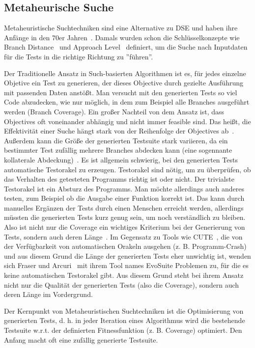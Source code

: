 \documentclass{article}
\begin{document}
\subsection{Metaheurische Suche}
Metaheuristische Suchtechniken sind eine Alternative zu DSE und haben ihre Anfänge in den 70er Jahren~\cite{McMinn_2004}. Damals wurden schon die Schlüsselkonzepte wie Branch Distance~\cite{Korel1990} und Approach Level~\cite{Wegener2001} definiert, um die Suche nach Inputdaten für die Tests in die richtige Richtung zu ''führen''.  

Der Traditionelle Ansatz in Such-basierten Algorithmen ist es, für jedes einzelne Objetive ein Test zu generieren, der dieses Objective durch gezielte Ausführung mit passenden Daten anstößt. Man versucht mit den generierten Tests so viel Code abzudecken, wie nur möglich, in dem zum Beispiel alle Branches ausgeführt werden (Branch Coverage). Ein großer Nachteil von dem Ansatz ist, dass Objectives oft voneinander abhängig und nicht immer feasible sind. Das heißt, die Effektivität einer Suche hängt stark von der Reihenfolge der Objectives ab~\cite{Fraser_2013}. Außerdem kann die Größe der generierten Testsuite stark variieren, da ein bestimmter Test zufällig mehrere Branches abdecken kann (eine sogennante kollaterale Abdeckung)~\cite{Harman2010}. Es ist allgemein schwierig, bei den generierten Tests automatische Testorakel zu erzeugen. Testorakel sind nötig, um zu überprüfen, ob das Verhalten des getesteten Programms richtig ist oder nicht. Der trivialste Testorakel ist ein Absturz des Programms.  Man möchte allerdings auch anderes testen, zum Beispiel ob die Ausgabe einer Funktion korrekt ist. Das kann durch manuelles Ergänzen der Tests durch einen Menschen erreicht werden, allerdings müssten die generierten Tests kurz genug sein, um noch verständlich zu bleiben. Also ist nicht nur die Coverage ein wichtiges Kriterium bei der Generierung von Tests, sondern auch deren Länge~\cite{Fraser_2013}. Im Gegensatz zu Tools wie CUTE~\cite{10.1007/11817963_38}, die von der Verfügbarkeit von automatischen Orakeln ausgehen (z. B. Programm-Crash) und aus diesem Grund die Länge der generierten Tests eher unwichtig ist, wenden sich Fraser und Arcuri~\cite{Fraser_2011} mit ihrem Tool names EvoSuite Problemen zu, für die es keine automatischen Testorakel gibt. Aus diesem Grund steht bei ihrem Ansatz nicht nur die Qualität der generierten Tests (also die Coverage), sondern auch deren Länge im Vordergrund. 

Der Kernpunkt von Metaheuristischen Suchtechniken ist die Optimisierung von generierten Tests, d. h. in jeder Iteration eines Algorithmus wird die bestehende Testsuite w.r.t. der definierten Fitnessfunktion (z. B. Coverage) optimiert. Den Anfang macht oft eine zufällig generierte Testsuite.  
\end{document}
